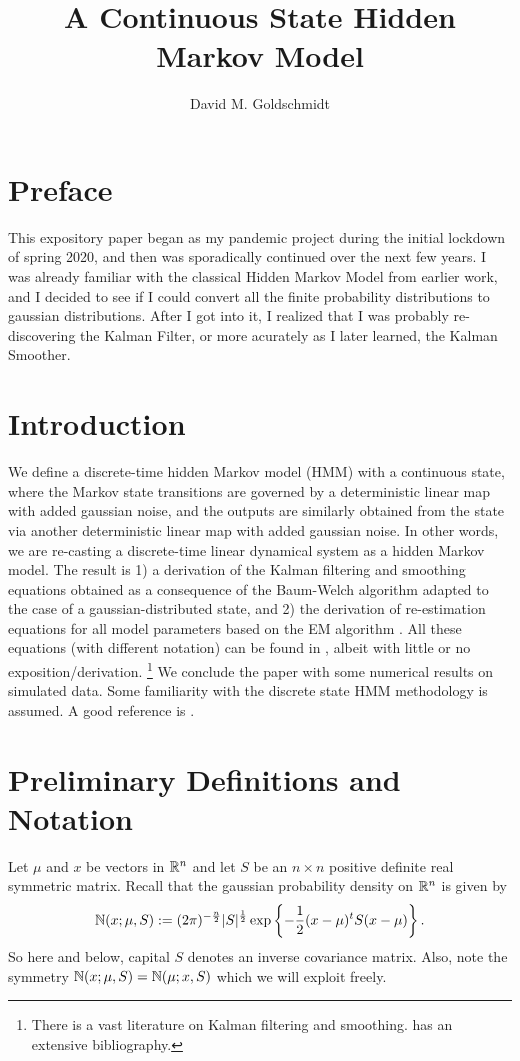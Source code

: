 \documentclass[12pt,leqno]{article}
\title{A Continuous State Hidden Markov Model}
\author{David M. Goldschmidt}
\begin{document}
\newcommand{\p}{\ensuremath{u}}
\newcommand{\VV}{V}
\maketitle

\section{Preface}
This expository paper  began as my pandemic project during the initial lockdown of spring 2020, and then was
sporadically
continued over the next few years.  I was already familiar with the classical Hidden Markov Model from earlier
work, and I decided to see if I could  convert all the finite probability distributions to gaussian distributions.
After I got into it, I realized that I was probably re-discovering the Kalman Filter, or more acurately as I later learned,
the Kalman Smoother.  

\section{Introduction}
We define a discrete-time hidden Markov model (HMM) with a continuous state, where the  Markov state transitions
are governed by a deterministic linear map with added gaussian noise, and the outputs are similarly obtained from the
state via another deterministic linear map with added gaussian noise.  In other words, we are re-casting a discrete-time
linear dynamical system as a hidden Markov model.  The result is 1) a derivation of the Kalman filtering and smoothing
equations \cite{Aravkin} obtained as a consequence of the Baum-Welch algorithm \cite{Bilmes} adapted to the case of a
gaussian-distributed state, and 2) the derivation of re-estimation equations for all model parameters based on the EM algorithm
\cite{Dempster}.  All these equations (with different notation) can be found in \cite{Hinton}, albeit with little or no
exposition/derivation.  \footnote{There is a vast literature on Kalman filtering and smoothing.  \cite{Aravkin} has an extensive bibliography.}
We conclude the paper with some numerical results on simulated data.
Some familiarity with the discrete state HMM methodology is assumed.  A good reference is \cite{Bilmes}. 

\section{Preliminary Definitions and Notation}
Let $\mu$ and $x$ be vectors in ${\mathbb R}^n$ and let $S$ be an $n\times{n}$ positive
definite real symmetric matrix.  Recall that the gaussian probability density
on ${\mathbb R}^n$ is given by 
$$
{\mathbb N}(x;\mu,S) := (2\pi)^{-\frac{n}{2}}|S|^{\frac{1}{2}}\exp\left\{-\frac{1}{2}
(x - \mu)^tS(x-\mu)\right\}.
$$
So here and below, capital $S$ denotes an inverse covariance matrix. Also, note the symmetry ${\mathbb N}(x;\mu,S) = {\mathbb N}(\mu;x,S)$
which we will exploit freely.
\end{document}
